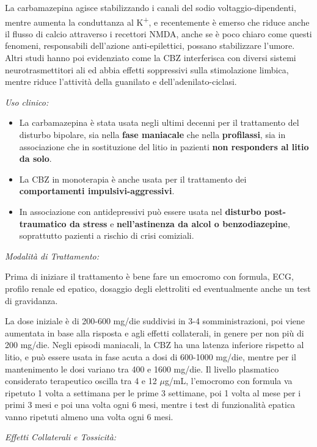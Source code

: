 \begin{itemize}
La carbamazepina agisce stabilizzando i canali del sodio
voltaggio-dipendenti, mentre aumenta la conduttanza al
K\textsuperscript{+}, e recentemente è emerso che riduce anche il flusso
di calcio attraverso i recettori NMDA, anche se è poco chiaro come
questi fenomeni, responsabili dell'azione anti-epilettici, possano
stabilizzare l'umore. Altri studi hanno poi evidenziato come la CBZ
interferisca con diversi sistemi neurotrasmettitori ali ed abbia effetti
soppressivi sulla stimolazione limbica, mentre riduce l'attività della
guanilato e dell'adenilato-ciclasi.

\emph{\emph{Uso clinico:}}

\begin{itemize}
\item
  La carbamazepina è stata usata negli ultimi decenni per il trattamento
  del disturbo bipolare, sia nella \textbf{fase maniacale} che nella
  \textbf{profilassi}, sia in associazione che in sostituzione del litio
  in pazienti \textbf{non responders al litio da solo}.
\item
  La CBZ in monoterapia è anche usata per il trattamento dei
  \textbf{comportamenti impulsivi-aggressivi}.
\item
  In associazione con antidepressivi può essere usata nel
  \textbf{disturbo post-traumatico da stress} e \textbf{nell'astinenza
  da alcol o benzodiazepine}, soprattutto pazienti a rischio di crisi
  comiziali.
\end{itemize}

\emph{\emph{Modalità di Trattamento:}}

Prima di iniziare il trattamento è bene fare un emocromo con formula,
ECG, profilo renale ed epatico, dosaggio degli elettroliti ed
eventualmente anche un test di gravidanza.

La dose iniziale è di 200-600 mg/die suddivisi in 3-4 somministrazioni,
poi viene aumentata in base alla risposta e agli effetti collaterali, in
genere per non più di 200 mg/die. Negli episodi maniacali, la CBZ ha una
latenza inferiore rispetto al litio, e può essere usata in fase acuta a
dosi di 600-1000 mg/die, mentre per il mantenimento le dosi variano tra
400 e 1600 mg/die. Il livello plasmatico considerato terapeutico oscilla
tra 4 e 12 $\mu$g/mL, l'emocromo con formula va ripetuto 1 volta a settimana
per le prime 3 settimane, poi 1 volta al mese per i primi 3 mesi e poi
una volta ogni 6 mesi, mentre i test di funzionalità epatica vanno
ripetuti almeno una volta ogni 6 mesi.

\emph{\emph{Effetti Collaterali e Tossicità:}}


\end{itemize}
